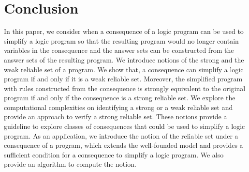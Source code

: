 \documentclass{article}
\begin{document}
\begin{comment}
\begin{table*}[htb]
\caption{Comparison between WFM, GWRS, GSRS in DLP}\label{tab:1}
\centering
{\small
\begin{tabular}{|l|r|r|r|r|r|r|r|r|r|}
\hline
Benchmark       & number	    &    N$_{a}$	& T$_{c}$          &	T$_{c'}$   & N$_W$	       & T$_{GWRS}$	   & N$_{GWRS}$	& T$_{GSRS}$ 	& N$_{GSRS}$\\
\hline
Hampath	&15	&170.067	&0.275	&71.467	&65.4	&0.009	&0	&0.001	&0 \\
Mutex	&7	&6449	&128.103	&6158.714	&3224	&61.451	&6158.714	&0.006	&0\\
RandomQuantifiedBooleanFormulas	&15	&160.067	&0.072	&91.4	&79.533	&0.024	&90.4	&0.001	&0\\
StrategicCompanies	&15	&2002	&6.917	&1861	&2288	&0.713	&0	&0	&0\\
\hline
\end{tabular}}
\vspace{-14pt}
\end{table*}
\end{comment}


\section{Conclusion}

In this paper, we consider when a consequence of a logic program can be used to simplify a logic program so that the resulting program would no longer contain variables in the consequence and the answer sets can be constructed from the answer sets of the resulting program.
We introduce notions of the strong and the weak reliable set of a program. We show that, a consequence can simplify a logic program if and only if it is a weak reliable set. Moreover, the simplified program with rules constructed from the consequence is strongly equivalent to the original program if and only if the consequence is a strong reliable set.
We explore the computational complexities on identifying a strong or a weak reliable set and provide an approach to verify a strong reliable set.
These notions provide a guideline to explore classes of consequences that could be used to simplify a logic program. As an application, we introduce the notion of the reliable set under a consequence of a program, which extends the well-founded model and provides a sufficient condition for a consequence to simplify a logic program. We also provide an algorithm to compute the notion.



\end{document}
